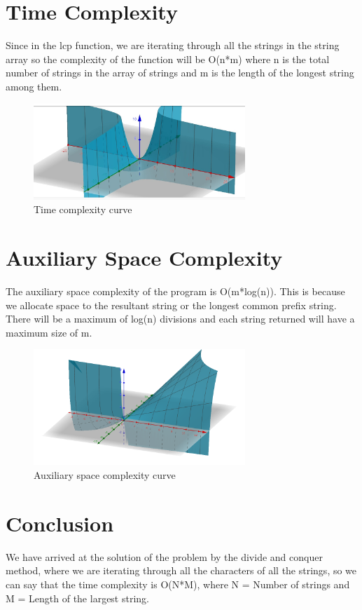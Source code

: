 \documentclass[conference]{IEEEtran}
\begin{document}
\section{\textbf {Time Complexity}}
\noindent Since in the lcp function, we are iterating through all the strings in the string array so the complexity of the function will be O(n*m) where n is the total number of strings in the array of strings and m is the length of the longest string among them.

\begin{figure}[htp]
    \centering
    \includegraphics[width=8cm]{TimeComplexity}
    \caption{Time complexity curve}
    \label{fig:timecomplexity}
\end{figure}

\section{\textbf {Auxiliary Space Complexity}}
\noindent The auxiliary space complexity of the program is O(m*log(n)). This is because we allocate space to the resultant string or the longest common prefix string. There will be a maximum of log(n) divisions and each string returned will have a maximum size of m.

\begin{figure}[htp]
    \centering
    \includegraphics[width=8cm]{AuxiliarySpaceComplexity}
    \caption{Auxiliary space complexity curve}
    \label{fig:AuxiliarySpaceComplexity.png}
\end{figure}

\section{\textbf {Conclusion}} \noindent We have arrived at the solution of the problem by the divide and conquer method, where we are iterating through all the characters of all the strings, so we can say that the time complexity is O(N*M), where N = Number of strings and  M = Length of the largest string.\\
\end{document}
